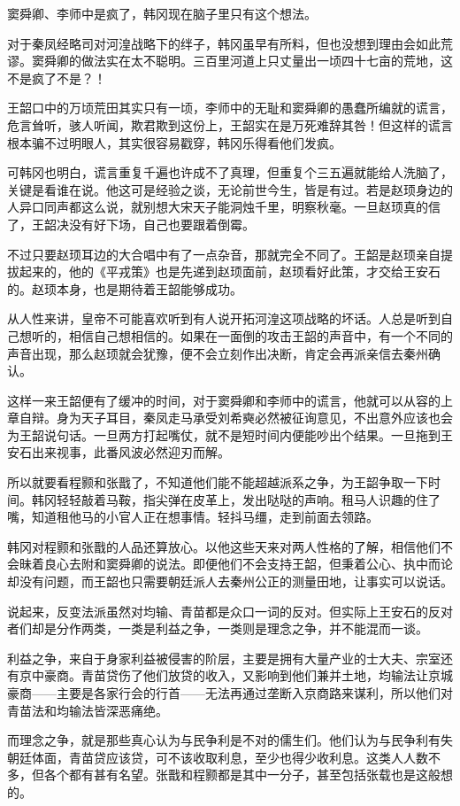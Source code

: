 窦舜卿、李师中是疯了，韩冈现在脑子里只有这个想法。

对于秦凤经略司对河湟战略下的绊子，韩冈虽早有所料，但也没想到理由会如此荒谬。窦舜卿的做法实在太不聪明。三百里河道上只丈量出一顷四十七亩的荒地，这不是疯了不是？！

王韶口中的万顷荒田其实只有一顷，李师中的无耻和窦舜卿的愚蠢所编就的谎言，危言耸听，骇人听闻，欺君欺到这份上，王韶实在是万死难辞其咎！但这样的谎言根本骗不过明眼人，其实很容易戳穿，韩冈乐得看他们发疯。

可韩冈也明白，谎言重复千遍也许成不了真理，但重复个三五遍就能给人洗脑了，关键是看谁在说。他这可是经验之谈，无论前世今生，皆是有过。若是赵顼身边的人异口同声都这么说，就别想大宋天子能洞烛千里，明察秋毫。一旦赵顼真的信了，王韶决没有好下场，自己也要跟着倒霉。

不过只要赵顼耳边的大合唱中有了一点杂音，那就完全不同了。王韶是赵顼亲自提拔起来的，他的《平戎策》也是先递到赵顼面前，赵顼看好此策，才交给王安石的。赵顼本身，也是期待着王韶能够成功。

从人性来讲，皇帝不可能喜欢听到有人说开拓河湟这项战略的坏话。人总是听到自己想听的，相信自己想相信的。如果在一面倒的攻击王韶的声音中，有一个不同的声音出现，那么赵顼就会犹豫，便不会立刻作出决断，肯定会再派亲信去秦州确认。

这样一来王韶便有了缓冲的时间，对于窦舜卿和李师中的谎言，他就可以从容的上章自辩。身为天子耳目，秦凤走马承受刘希奭必然被征询意见，不出意外应该也会为王韶说句话。一旦两方打起嘴仗，就不是短时间内便能吵出个结果。一旦拖到王安石出来视事，此番风波必然迎刃而解。

所以就要看程颢和张戬了，不知道他们能不能超越派系之争，为王韶争取一下时间。韩冈轻轻敲着马鞍，指尖弹在皮革上，发出哒哒的声响。租马人识趣的住了嘴，知道租他马的小官人正在想事情。轻抖马缰，走到前面去领路。

韩冈对程颢和张戬的人品还算放心。以他这些天来对两人性格的了解，相信他们不会昧着良心去附和窦舜卿的说法。即便他们不会支持王韶，但秉着公心、执中而论却没有问题，而王韶也只需要朝廷派人去秦州公正的测量田地，让事实可以说话。

说起来，反变法派虽然对均输、青苗都是众口一词的反对。但实际上王安石的反对者们却是分作两类，一类是利益之争，一类则是理念之争，并不能混而一谈。

利益之争，来自于身家利益被侵害的阶层，主要是拥有大量产业的士大夫、宗室还有京中豪商。青苗贷伤了他们放贷的收入，又影响到他们兼并土地，均输法让京城豪商——主要是各家行会的行首——无法再通过垄断入京商路来谋利，所以他们对青苗法和均输法皆深恶痛绝。

而理念之争，就是那些真心认为与民争利是不对的儒生们。他们认为与民争利有失朝廷体面，青苗贷应该贷，可不该收取利息，至少也得少收利息。这类人人数不多，但各个都有甚有名望。张戬和程颢都是其中一分子，甚至包括张载也是这般想的。

